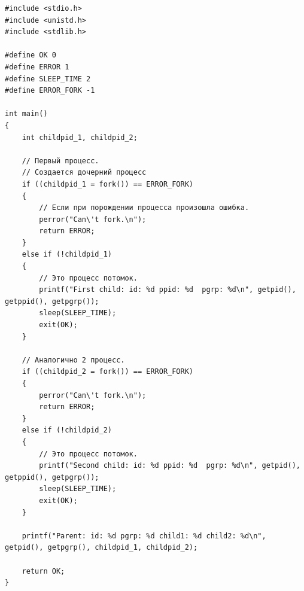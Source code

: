 


\begin{lstlisting}[label=some-code,caption=Программа 1.]
#include <stdio.h>
#include <unistd.h>
#include <stdlib.h>

#define OK 0
#define ERROR 1
#define SLEEP_TIME 2
#define ERROR_FORK -1

int main()
{
	int childpid_1, childpid_2;

	// Первый процесс.
	// Создается дочерний процесс
	if ((childpid_1 = fork()) == ERROR_FORK)
	{
		// Если при порождении процесса произошла ошибка.
		perror("Can\'t fork.\n");
		return ERROR;
	}
	else if (!childpid_1)
	{
		// Это процесс потомок.
		printf("First child: id: %d ppid: %d  pgrp: %d\n", getpid(), getppid(), getpgrp());
		sleep(SLEEP_TIME);
		exit(OK);
	}

	// Аналогично 2 процесс.
	if ((childpid_2 = fork()) == ERROR_FORK)
	{
		perror("Can\'t fork.\n");
		return ERROR;
	}
	else if (!childpid_2)
	{
		// Это процесс потомок.
		printf("Second child: id: %d ppid: %d  pgrp: %d\n", getpid(), getppid(), getpgrp());
		sleep(SLEEP_TIME);
		exit(OK);
	}

	printf("Parent: id: %d pgrp: %d child1: %d child2: %d\n", getpid(), getpgrp(), childpid_1, childpid_2);

	return OK;
}
\end{lstlisting}

\begin{figure}[ht!]
\end{figure}

